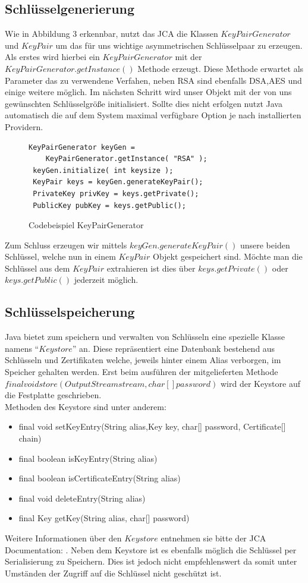 \documentclass[paper=a4,11pt,german]{scrartcl} %
\begin{document}
\subsection{Schlüsselgenerierung}
Wie in Abbildung 3 erkennbar, nutzt das JCA die Klassen $KeyPairGenerator$ und $KeyPair$ um das für uns wichtige asymmetrischen Schlüsselpaar zu erzeugen. Als erstes wird hierbei ein $KeyPairGenerator$ mit der $KeyPairGenerator.getInstance()$ Methode erzeugt. Diese Methode erwartet als Parameter das zu verwendene Verfahen, neben RSA sind ebenfalls DSA,AES und einige weitere möglich.
Im nächsten Schritt wird unser Objekt mit der von uns gewünschten Schlüsselgröße initialisiert. Sollte dies nicht erfolgen nutzt Java automatisch die auf dem System maximal verfügbare Option je nach installierten Providern. 
\begin{figure}[h]
\caption{Codebeispiel KeyPairGenerator}
\begin{lstlisting}[frame=shadowbox]
 KeyPairGenerator keyGen = 
 	KeyPairGenerator.getInstance( "RSA" );
 keyGen.initialize( int keysize );
 KeyPair keys = keyGen.generateKeyPair();
 PrivateKey privKey = keys.getPrivate();
 PublicKey pubKey = keys.getPublic();
\end{lstlisting}
\label{KeyPairGenerator}
\end{figure}
Zum Schluss erzeugen wir mittels $keyGen.generateKeyPair()$ unsere beiden Schlüssel, welche nun in einem $KeyPair$ Objekt gespeichert sind. Möchte man die Schlüssel aus dem $KeyPair$ extrahieren ist dies über $keys.getPrivate()$ oder $keys.getPublic()$ jederzeit möglich.

\subsection{Schlüsselspeicherung}
Java bietet zum speichern und verwalten von Schlüsseln eine spezielle Klasse namens ``$Keystore$'' an. Diese repräsentiert eine Datenbank bestehend aus Schlüsseln und Zertifikaten welche, jeweils hinter einem Alias verborgen, im Speicher gehalten werden. Erst beim   ausführen der mitgelieferten Methode $final void store(OutputStream stream, char[] password)$ wird der Keystore auf die Festplatte geschrieben.\\
Methoden des Keystore sind unter anderem:
\begin{itemize}
\item final void setKeyEntry(String alias,Key key,
                       char[] password,
                       Certificate[] chain)
\item final boolean isKeyEntry(String alias)
\item final boolean isCertificateEntry(String alias)
\item final void deleteEntry(String alias)
\item final Key getKey(String alias, char[] password)
\end{itemize}
Weitere Informationen über den $Keystore$ entnehmen sie bitte der JCA Documentation: \cite{JCAdoc} .
Neben dem Keystore ist es ebenfalls möglich die Schlüssel per Serialisierung zu Speichern. Dies ist jedoch nicht empfehlenswert da somit unter Umständen der Zugriff auf die Schlüssel nicht geschützt ist.
 
\end{document}
